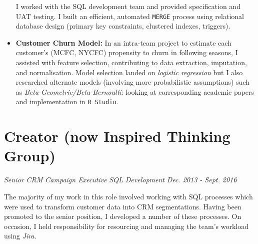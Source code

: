 \documentclass[letterpaper,11pt]{article}
\begin{document}
\begin{itemize}
{	      I worked with the SQL development team and provided specification and UAT testing. I built an efficient, automated \texttt{MERGE} process using relational database design (primary key constraints, clustered indexes, triggers).
	      }
	\item
	      {
	      \textbf{Customer Churn Model:}
	      In an intra-team project to estimate each customer's (MCFC, NYCFC) propensity to churn in following seasons, I assisted with feature selection, contributing to data extraction, imputation, and normalisation. Model selection landed on \textit{logistic regression} but I also researched alternate models (involving more probabilistic assumptions) such as \textit{Beta-Geometric/Beta-Bernoulli}: looking at corresponding academic papers and implementation in \texttt{R Studio}.
	      }
\end{itemize}
\section{Creator (now Inspired Thinking Group)}
\textit{Senior CRM Campaign Executive}
\hfill
\textit{SQL Development}
\hfill
\textit{Dec. 2013 - Sept. 2016\\}

\noindent
The majority of my work in this role involved working with SQL processes which were used to transform customer data into CRM segmentations. Having been promoted to the senior position, I developed a number of these processes. On occasion, I held responsibility for resourcing and managing the team's workload using \textit{Jira}.
\end{document}
